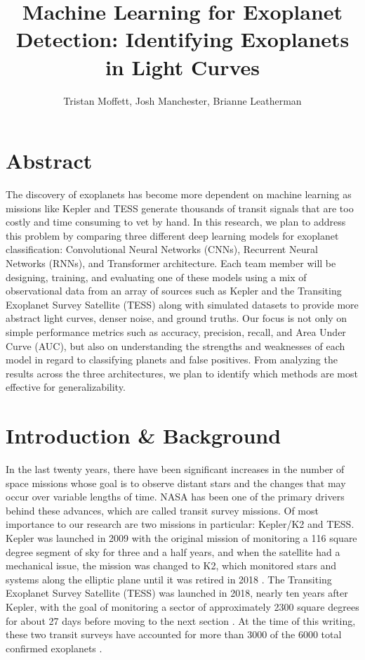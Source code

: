 \documentclass[letterpaper]{article} %
\title{Machine Learning for Exoplanet Detection: Identifying Exoplanets in Light Curves}
\author {
    Tristan Moffett\textsuperscript{\rm },
    Josh Manchester\textsuperscript{\rm },
    Brianne Leatherman\textsuperscript{\rm }
}
\begin{document}
\maketitle

\section*{Abstract}
The discovery of exoplanets has become more dependent on machine learning as missions like Kepler and TESS generate thousands of transit signals that are too costly and time consuming to vet by hand. In this research, we plan to address this problem by comparing three different deep learning models for exoplanet classification: Convolutional Neural Networks (CNNs), Recurrent Neural Networks (RNNs), and Transformer architecture. Each team member will be designing, training, and evaluating one of these models using a mix of observational data from an array of sources such as Kepler and the Transiting Exoplanet Survey Satellite (TESS) along with simulated datasets to provide more abstract light curves, denser noise, and ground truths. Our focus is not only on simple performance metrics such as accuracy, precision, recall, and Area Under Curve (AUC), but also on understanding the strengths and weaknesses of each model in regard to classifying planets and false positives. From analyzing the results across the three architectures, we plan to identify which methods are most effective for generalizability.

\section*{Introduction \& Background}
In the last twenty years, there have been significant increases in the number of space missions whose goal is to observe distant stars and the changes that may occur over variable lengths of time. NASA has been one of the primary drivers behind these advances, which are called transit survey missions. Of most importance to our research are two missions in particular: Kepler/K2 and TESS. Kepler was launched in 2009 with the original mission of monitoring a 116 square degree segment of sky for three and a half years, and when the satellite had a mechanical issue, the mission was changed to K2, which monitored stars and systems along the elliptic plane until it was retired in 2018 \cite{salinas2023distinguishingtransitfalsepositives}. The Transiting Exoplanet Survey Satellite (TESS) was launched in 2018, nearly ten years after Kepler, with the goal of monitoring a sector of approximately 2300 square degrees for about 27 days before moving to the next section \cite{salinas2023distinguishingtransitfalsepositives}. At the time of this writing, these two transit surveys have accounted for more than 3000 of the 6000 total confirmed exoplanets \cite{salinas2025tessfullframe}. 
\end{document}
